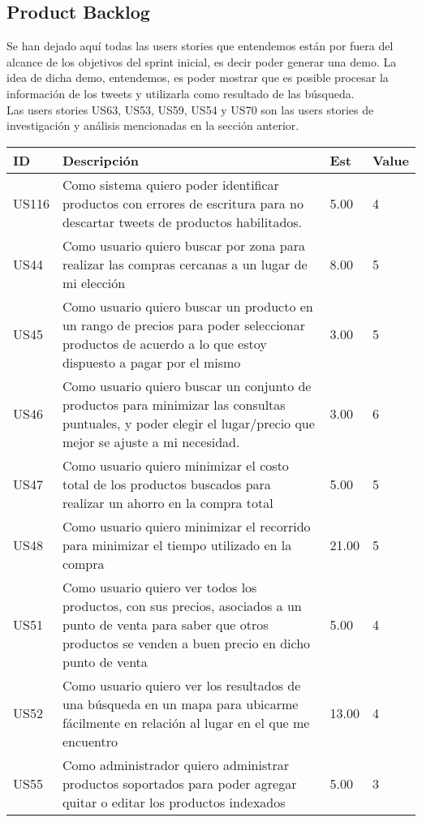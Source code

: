 \documentclass[a4paper,8pt]{article}
\begin{document}
\subsection{Product Backlog}
Se han dejado aquí todas las users stories que entendemos están por fuera del alcance de los objetivos del sprint inicial, es decir poder generar una demo. La idea de dicha demo, entendemos, es poder mostrar que es posible procesar la información de los tweets y utilizarla como resultado de las búsqueda. \\
Las users stories US63, US53, US59, US54 y US70 son las users stories de investigación y análisis mencionadas en la sección anterior.\\
\newpage


\begin{tabular}{|p{1cm}|p{10cm}|p{1cm}|p{1cm}|}
\hline
\hline
\textbf{ID}&\textbf{Descripción}&\textbf{Est}&\textbf{Value}\\
\hline
\hline
US116& Como sistema quiero poder identificar productos con errores de escritura para no descartar tweets de productos habilitados. &5.00&4\\ 
\hline
US44 &Como usuario quiero buscar por zona para realizar las compras cercanas a un lugar de mi elección &8.00&5\\ 
\hline	
US45 &Como usuario quiero buscar un producto en un rango de precios para poder seleccionar productos de acuerdo a lo que estoy dispuesto a pagar por el mismo &3.00&5\\ 
\hline	
US46 &Como usuario quiero buscar un conjunto de productos para minimizar las consultas puntuales, y poder elegir el lugar/precio que mejor se ajuste a mi necesidad. &3.00&6\\ 
\hline	
US47 &Como usuario quiero minimizar el costo total de los productos buscados para realizar un ahorro en la compra total &5.00&5\\ 
\hline	
US48 &Como usuario quiero minimizar el recorrido para minimizar el tiempo utilizado en la compra &21.00&5\\ 
\hline	
US51 &Como usuario quiero ver todos los productos, con sus precios, asociados a un punto de venta para saber que otros productos se venden a buen precio en dicho punto de venta &5.00&4\\ 
\hline	
US52 &Como usuario quiero ver los resultados de una búsqueda en un mapa para ubicarme fácilmente en relación al lugar en el que me encuentro& 13.00&4\\ 
\hline
US55 &Como administrador quiero administrar productos soportados para poder agregar quitar o editar los productos indexados &5.00&3\\ 

\end{tabular}
\end{document}
